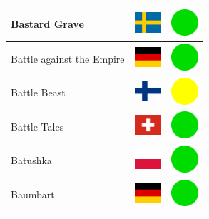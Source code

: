 \documentclass[12pt, a4paper, twoside]{report}
\begin{document}
\begin{center}
\begin{longtable}{|p{5cm}|p{2cm}|p{2cm}|}
 Bastard Grave                                              & \includegraphics[width=1cm]{../img/flags/se} &   \includegraphics[width=1cm]{../likes/y} \\ \hline
 Battle against the Empire                                  & \includegraphics[width=1cm]{../img/flags/de} &   \includegraphics[width=1cm]{../likes/y} \\ \hline
 Battle Beast                                               & \includegraphics[width=1cm]{../img/flags/fi} &   \includegraphics[width=1cm]{../likes/m} \\ \hline
 Battle Tales                                               & \includegraphics[width=1cm]{../img/flags/ch} &   \includegraphics[width=1cm]{../likes/y} \\ \hline
 Batushka                                                   & \includegraphics[width=1cm]{../img/flags/pl} &   \includegraphics[width=1cm]{../likes/y} \\ \hline
 Baumbart                                                   & \includegraphics[width=1cm]{../img/flags/de} &   \includegraphics[width=1cm]{../likes/y} \\ \hline

\end{longtable}
\end{center}
\end{document}
